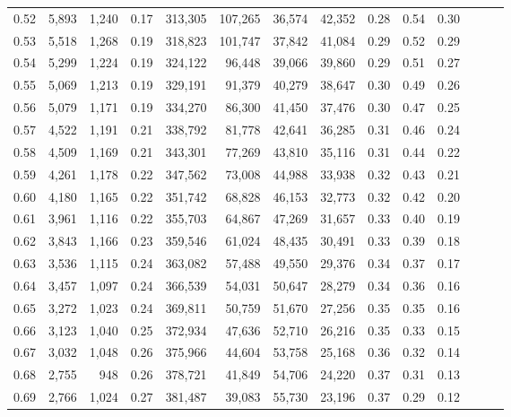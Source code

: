\begin{tabular}{rrrrrrrrrrrrrr}
0.52 &   5,893 &  1,240 &  0.17 &  313,305 &  107,265 &  36,574 &  42,352 &  0.28 &  0.54 &      0.30 \\
0.53 &   5,518 &  1,268 &  0.19 &  318,823 &  101,747 &  37,842 &  41,084 &  0.29 &  0.52 &      0.29 \\
0.54 &   5,299 &  1,224 &  0.19 &  324,122 &   96,448 &  39,066 &  39,860 &  0.29 &  0.51 &      0.27 \\
0.55 &   5,069 &  1,213 &  0.19 &  329,191 &   91,379 &  40,279 &  38,647 &  0.30 &  0.49 &      0.26 \\
0.56 &   5,079 &  1,171 &  0.19 &  334,270 &   86,300 &  41,450 &  37,476 &  0.30 &  0.47 &      0.25 \\
0.57 &   4,522 &  1,191 &  0.21 &  338,792 &   81,778 &  42,641 &  36,285 &  0.31 &  0.46 &      0.24 \\
0.58 &   4,509 &  1,169 &  0.21 &  343,301 &   77,269 &  43,810 &  35,116 &  0.31 &  0.44 &      0.22 \\
0.59 &   4,261 &  1,178 &  0.22 &  347,562 &   73,008 &  44,988 &  33,938 &  0.32 &  0.43 &      0.21 \\
0.60 &   4,180 &  1,165 &  0.22 &  351,742 &   68,828 &  46,153 &  32,773 &  0.32 &  0.42 &      0.20 \\
0.61 &   3,961 &  1,116 &  0.22 &  355,703 &   64,867 &  47,269 &  31,657 &  0.33 &  0.40 &      0.19 \\
0.62 &   3,843 &  1,166 &  0.23 &  359,546 &   61,024 &  48,435 &  30,491 &  0.33 &  0.39 &      0.18 \\
0.63 &   3,536 &  1,115 &  0.24 &  363,082 &   57,488 &  49,550 &  29,376 &  0.34 &  0.37 &      0.17 \\
0.64 &   3,457 &  1,097 &  0.24 &  366,539 &   54,031 &  50,647 &  28,279 &  0.34 &  0.36 &      0.16 \\
0.65 &   3,272 &  1,023 &  0.24 &  369,811 &   50,759 &  51,670 &  27,256 &  0.35 &  0.35 &      0.16 \\
0.66 &   3,123 &  1,040 &  0.25 &  372,934 &   47,636 &  52,710 &  26,216 &  0.35 &  0.33 &      0.15 \\
0.67 &   3,032 &  1,048 &  0.26 &  375,966 &   44,604 &  53,758 &  25,168 &  0.36 &  0.32 &      0.14 \\
0.68 &   2,755 &    948 &  0.26 &  378,721 &   41,849 &  54,706 &  24,220 &  0.37 &  0.31 &      0.13 \\
0.69 &   2,766 &  1,024 &  0.27 &  381,487 &   39,083 &  55,730 &  23,196 &  0.37 &  0.29 &      0.12 \\

\end{tabular}
